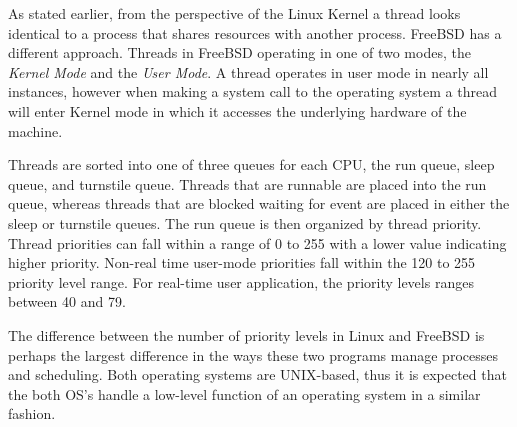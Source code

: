     \normalfont \indent As stated earlier, from the perspective of the Linux Kernel a thread looks identical to a process that shares resources with another process. FreeBSD has a different approach. Threads in FreeBSD operating in one of two modes, the \cite{FreeBSD}\textit{Kernel Mode} and the \textit{User Mode}. A thread operates in user mode in nearly all instances, however when making a system call to the operating system a thread will enter Kernel mode in which it accesses the underlying hardware of the machine.

    \normalfont \indent Threads are sorted into one of three queues for each CPU,  \cite{FreeBSDDesign} the run queue, sleep queue, and turnstile queue. Threads that are runnable are placed into the run queue, whereas threads that are blocked waiting for event are placed in either the sleep or turnstile queues. The run queue is then organized by thread priority. Thread priorities can fall within a range of 0 to 255 with a lower value indicating higher priority. Non-real time user-mode priorities fall within the 120 to 255 priority level range. For real-time user application, the priority levels ranges between 40 and 79\cite{FreeBSDDesign}.

    \normalfont \indent The difference between the number of  priority levels in Linux and FreeBSD is perhaps the largest difference in the ways these two programs manage processes and scheduling. Both operating systems are UNIX-based, thus it is expected that the both OS’s handle a low-level function of an operating system in a similar fashion.




